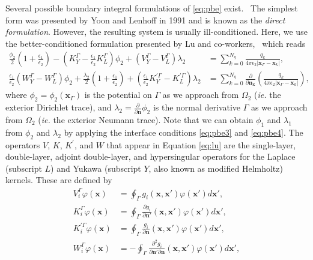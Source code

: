 Several possible boundary integral formulations of \eqref{eq:pbe} exist.~\cite{search2022towards} The simplest form was presented by Yoon and Lenhoff in 1991\cite{YoonLenhoff1990} and is known as the \emph{direct formulation}. However, the resulting system is usually ill-conditioned. Here, we use the better-conditioned formulation presented by Lu and co-workers,~\cite{LuETal2006, LuETal2009,debuhr2016dashmm} which reads
%
\begin{align}\label{eq:lu}
    \tfrac{\phi_2}{2}\left(1+\tfrac{\epsilon_1}{\epsilon_2}\right) - \left(K_Y^\Gamma - \tfrac{\epsilon_1}{\epsilon_2}K_L^\Gamma\right)\phi_2 + \left(V_Y^\Gamma - V_L^\Gamma\right)\lambda_2 &= \sum_{k=0}^{N_q}  \frac{q_k}{4\pi\epsilon_2|\mathbf{x}_{\Gamma} - \mathbf{x}_k|},
     \nonumber \\
    \tfrac{\epsilon_1}{\epsilon_2}\left(W_Y^\Gamma - W_L^\Gamma\right)\phi_2 +  \tfrac{\lambda_2}{2}\left(1+\tfrac{\epsilon_1}{\epsilon_2}\right) + \left(\tfrac{\epsilon_1}{\epsilon_2}K_Y^{\prime\Gamma} - K_L^{\prime\Gamma}\right)\lambda_2 &= \sum_{k=0}^{N_q}  \frac{\partial}{\partial\mathbf{n}_\mathbf{x}}\left(\frac{q_k}{4\pi\epsilon_2|\mathbf{x}_{\Gamma} - \mathbf{x}_k|}\right),
\end{align}
where $\phi_2 = \phi_2(\mathbf{x}_\Gamma)$ is the potential on $\Gamma$ as we approach from $\Omega_2$ ({\it ie.} the exterior Dirichlet trace),
and $\lambda_2 = \frac{\partial}{\partial \mathbf{n}}\phi_2$ is the normal derivative $\Gamma$ as we approach from $\Omega_2$ ({\it ie.} the exterior Neumann trace).
Note that we can obtain $\phi_1$ and $\lambda_1$ from $\phi_2$ and $\lambda_2$ by applying the interface conditions \eqref{eq:pbe3} and \eqref{eq:pbe4}.
The operators $V$, $K$, $K^{\prime}$, and $W$ that appear in Equation \eqref{eq:lu} are the single-layer, double-layer, adjoint double-layer, and hypersingular operators for the Laplace (subscript $L$) and Yukawa (subscript $Y$, also known as modified Helmholtz) kernels. These are defined %
by
%
\begin{align}\label{eq:all_op}
V_i^\Gamma \varphi (\mathbf{x}) &= \oint_\Gamma g_i(\mathbf{x},\mathbf{x}')\varphi(\mathbf{x}')d\mathbf{x}',\nonumber\\
K_i^\Gamma \varphi (\mathbf{x}) &= \oint_\Gamma \frac{\partial g_i}{\partial\mathbf{n}'}(\mathbf{x},\mathbf{x}')\varphi(\mathbf{x}')d\mathbf{x}',\nonumber\\
K^{\prime\Gamma}_i\varphi (\mathbf{x}) &= \oint_\Gamma \frac{g_i}{\partial\mathbf{n}}(\mathbf{x},\mathbf{x}')\varphi(\mathbf{x}')d\mathbf{x}',\nonumber\\
W^\Gamma_i\varphi (\mathbf{x}) &= - \oint_\Gamma \frac{\partial^2 g_i}{\partial\mathbf{n}'\partial\mathbf{n}}(\mathbf{x},\mathbf{x}')\varphi(\mathbf{x}')d\mathbf{x}',
\end{align}
